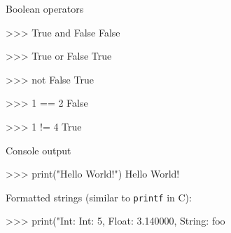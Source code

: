 \documentclass[10pt]{beamer}
\begin{document}

\begin{frame}[fragile]{Boolean operators}

    \begin{pythoncode}
        >>> True and False
        False
    \end{pythoncode}

    \pause

    \begin{pythoncode}
        >>> True or False
        True
    \end{pythoncode}

    \pause

    \begin{pythoncode}
        >>> not False
        True
    \end{pythoncode}

    \pause

    \begin{pythoncode}
        >>> 1 == 2
        False
    \end{pythoncode}

    \begin{pythoncode}
        >>> 1 != 4
        True
    \end{pythoncode}

\end{frame}


\begin{frame}[fragile]{Console output}

    \begin{pythoncode}
        >>> print("Hello World!")
        Hello World!
    \end{pythoncode}

    \pause

    Formatted strings (similar to \texttt{printf} in C):

    \begin{pythoncode}
        >>> print("Int: %
        Int: 5, Float: 3.140000, String: foo
    \end{pythoncode}

\end{frame}

\end{document}
